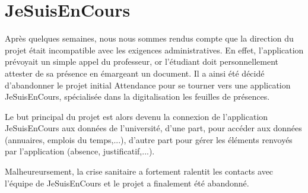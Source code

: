 \section{JeSuisEnCours}

Après quelques semaines, nous nous sommes rendus compte que la direction du projet était incompatible avec les exigences administratives. En effet, l'application prévoyait un simple appel du professeur, or l'étudiant doit personnellement attester de sa présence en émargeant un document. Il a ainsi été décidé d'abandonner le projet initial Attendance pour se tourner vers une application JeSuisEnCours, spécialisée dans la digitalisation les feuilles de présences. 

Le but principal du projet est alors devenu la connexion de l'application JeSuisEnCours aux données de l'université, d'une part, pour accéder aux données (annuaires, emplois du temps,...), d'autre part pour gérer les éléments renvoyés par l'application (absence, justificatif,...).

Malheureursement, la crise sanitaire a fortement ralentit les contacts avec l'équipe de JeSuisEnCours et le projet a finalement été abandonné.